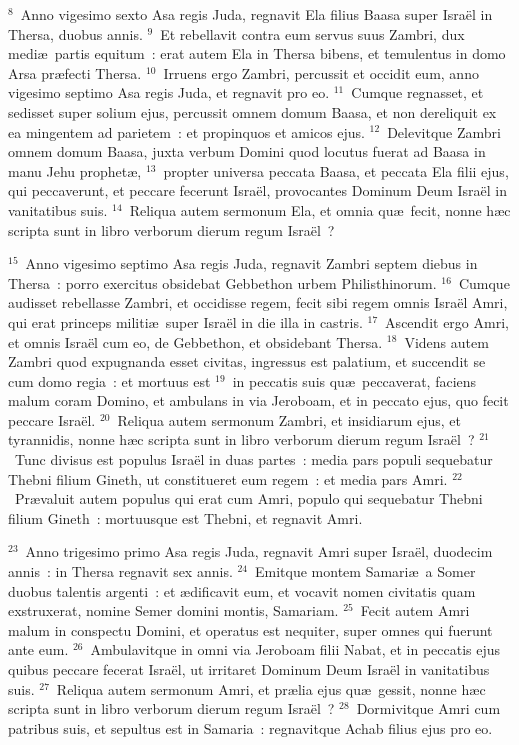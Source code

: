 ${}^{8}$~Anno vigesimo sexto Asa regis Juda, regnavit Ela filius Baasa super Isra\"el in Thersa, duobus annis.
${}^{9}$~Et rebellavit contra eum servus suus Zambri, dux medi\ae\ partis equitum~: erat autem Ela in Thersa bibens, et temulentus in domo Arsa pr\ae fecti Thersa.
${}^{10}$~Irruens ergo Zambri, percussit et occidit eum, anno vigesimo septimo Asa regis Juda, et regnavit pro eo.
${}^{11}$~Cumque regnasset, et sedisset super solium ejus, percussit omnem domum Baasa, et non dereliquit ex ea mingentem ad parietem~: et propinquos et amicos ejus.
${}^{12}$~Delevitque Zambri omnem domum Baasa, juxta verbum Domini quod locutus fuerat ad Baasa in manu Jehu prophet\ae ,
${}^{13}$~propter universa peccata Baasa, et peccata Ela filii ejus, qui peccaverunt, et peccare fecerunt Isra\"el, provocantes Dominum Deum Isra\"el in vanitatibus suis.
${}^{14}$~Reliqua autem sermonum Ela, et omnia qu\ae\ fecit, nonne h\ae c scripta sunt in libro verborum dierum regum Isra\"el~?


${}^{15}$~Anno vigesimo septimo Asa regis Juda, regnavit Zambri septem diebus in Thersa~: porro exercitus obsidebat Gebbethon urbem Philisthinorum.
${}^{16}$~Cumque audisset rebellasse Zambri, et occidisse regem, fecit sibi regem omnis Isra\"el Amri, qui erat princeps militi\ae\ super Isra\"el in die illa in castris.
${}^{17}$~Ascendit ergo Amri, et omnis Isra\"el cum eo, de Gebbethon, et obsidebant Thersa.
${}^{18}$~Videns autem Zambri quod expugnanda esset civitas, ingressus est palatium, et succendit se cum domo regia~: et mortuus est
${}^{19}$~in peccatis suis qu\ae\ peccaverat, faciens malum coram Domino, et ambulans in via Jeroboam, et in peccato ejus, quo fecit peccare Isra\"el.
${}^{20}$~Reliqua autem sermonum Zambri, et insidiarum ejus, et tyrannidis, nonne h\ae c scripta sunt in libro verborum dierum regum Isra\"el~?
${}^{21}$~Tunc divisus est populus Isra\"el in duas partes~: media pars populi sequebatur Thebni filium Gineth, ut constitueret eum regem~: et media pars Amri.
${}^{22}$~Pr\ae valuit autem populus qui erat cum Amri, populo qui sequebatur Thebni filium Gineth~: mortuusque est Thebni, et regnavit Amri.


${}^{23}$~Anno trigesimo primo Asa regis Juda, regnavit Amri super Isra\"el, duodecim annis~: in Thersa regnavit sex annis.
${}^{24}$~Emitque montem Samari\ae\ a Somer duobus talentis argenti~: et \ae dificavit eum, et vocavit nomen civitatis quam exstruxerat, nomine Semer domini montis, Samariam.
${}^{25}$~Fecit autem Amri malum in conspectu Domini, et operatus est nequiter, super omnes qui fuerunt ante eum.
${}^{26}$~Ambulavitque in omni via Jeroboam filii Nabat, et in peccatis ejus quibus peccare fecerat Isra\"el, ut irritaret Dominum Deum Isra\"el in vanitatibus suis.
${}^{27}$~Reliqua autem sermonum Amri, et pr\ae lia ejus qu\ae\ gessit, nonne h\ae c scripta sunt in libro verborum dierum regum Isra\"el~?
${}^{28}$~Dormivitque Amri cum patribus suis, et sepultus est in Samaria~: regnavitque Achab filius ejus pro eo.


